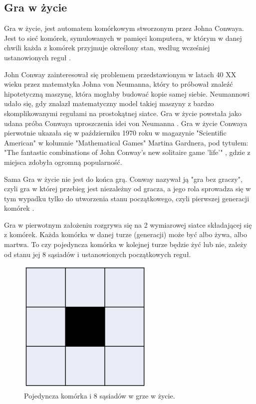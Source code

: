 \documentclass[a4paper,12pt,reqno]{article}
\begin{document}
\newpage
\subsection{Gra w życie}

Gra w życie, jest automatem komórkowym stworzonym przez Johna Conwaya. Jest to sieć komórek, symulowanych w pamięci komputera, w którym w danej chwili każda z komórek przyjmuje określony stan, według wcześniej ustanowionych reguł \cite{game_of_life_zero_cellular_automata}. 

John Conway zainteresował się problemem przedstawionym w latach 40 XX wieku przez matematyka Johna von Neumanna, który to próbował znaleźć hipotetyczną maszynę, która mogłaby budować kopie samej siebie. Neumannowi udało się, gdy znalazł matematyczny model takiej maszyny z bardzo skomplikowanymi regułami na prostokątnej siatce. Gra w życie powstała jako udana próba Conwaya uproszczenia idei von Neumanna \cite{game_of_life_story}. Gra w życie Conwaya pierwotnie ukazała się w październiku 1970 roku w magazynie "Scientific American" w kolumnie "Mathematical Games" Martina Gardnera, pod tytułem: "The fantastic combinations of John Conway's new solitaire game 'life'" \cite{game_of_life_methematical_games}, gdzie z miejsca zdobyła ogromną popularność.


 Sama Gra w życie nie jest do końca grą. Conway nazywał ją "gra bez graczy", czyli gra w której przebieg jest niezależny od gracza, a jego rola sprowadza się w tym wypadku tylko do utworzenia stanu początkowego, czyli pierwszej generacji komórek \cite{game_of_life_zero_player}. 


 Gra w pierwotnym założeniu rozgrywa się na 2 wymiarowej siatce składającej się z komórek. Każda komórka w danej turze (generacji) może być albo żywa, albo martwa. To czy pojedyncza komórka w kolejnej turze będzie żyć lub nie, zależy od stanu jej 8 sąsiadów i ustanowionych początkowych reguł.

\begin{figure}[!ht]%
\centering
\includegraphics[width=0.2\columnwidth]{graphics//gameoflife/GOL_Cell.png}
\caption{Pojedyncza komórka i 8 sąsiadów w grze w życie.
\label{BPExample}}%
%
\qquad
\end{figure} 
\end{document}
